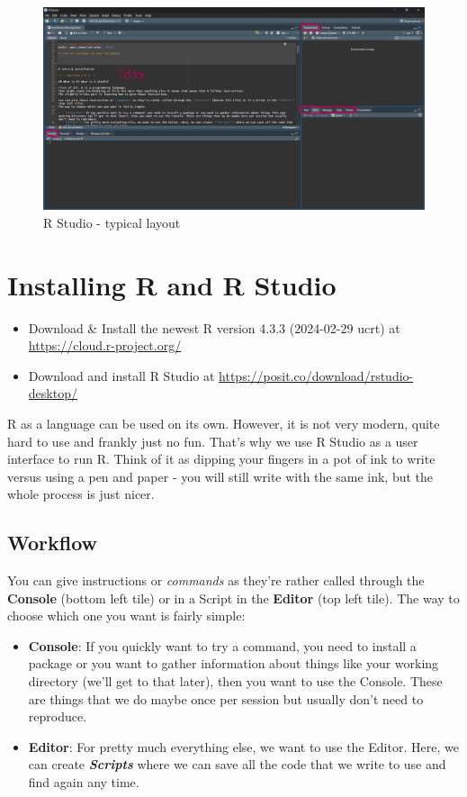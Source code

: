 \documentclass[
]{book}
\providecommand{\tightlist}{%
  \setlength{\itemsep}{0pt}\setlength{\parskip}{0pt}}
\begin{document}
\begin{figure}
\centering
\includegraphics{./img/rstudio.png}
\caption{R Studio - typical layout}
\end{figure}

\section{Installing R and R Studio}\label{installing-r-and-r-studio}

\begin{itemize}
\tightlist
\item
  Download \& Install the newest R version 4.3.3 (2024-02-29 ucrt) at \url{https://cloud.r-project.org/}
\item
  Download and install R Studio at \url{https://posit.co/download/rstudio-desktop/}
\end{itemize}

R as a language can be used on its own.
However, it is not very modern, quite hard to use and frankly just no fun.
That's why we use R Studio as a user interface to run R.
Think of it as dipping your fingers in a pot of ink to write versus using a pen and paper - you will still write with the same ink, but the whole process is just nicer.

\subsection{Workflow}\label{workflow}

You can give instructions or \emph{commands} as they're rather called through the \textbf{Console} (bottom left tile) or in a Script in the \textbf{Editor} (top left tile).
The way to choose which one you want is fairly simple:

\begin{itemize}
\tightlist
\item
  \textbf{Console}: If you quickly want to try a command, you need to install a package or you want to gather information about things like your working directory (we'll get to that later), then you want to use the Console. These are things that we do maybe once per session but usually don't need to reproduce.
\item
  \textbf{Editor}: For pretty much everything else, we want to use the Editor. Here, we can create \textbf{\emph{Scripts}} where we can save all the code that we write to use and find again any time.
\end{itemize}
\end{document}
